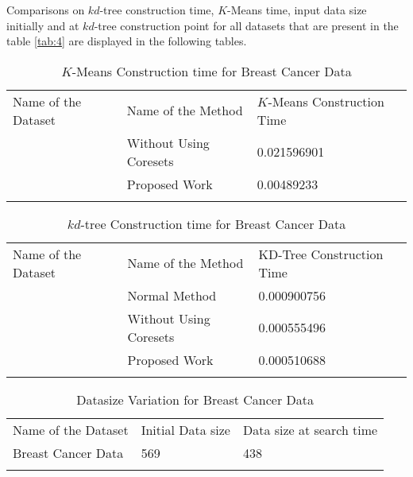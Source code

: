 \documentclass[runningheads]{llncs}
\begin{document}
Comparisons on $kd$-tree construction time, $K$-Means time, input data size initially and at $kd$-tree construction point for all datasets that are present in the table \ref{tab:4} are displayed in the following tables. 
\begin{table}[!hbt]
	\caption{$K$-Means Construction time for Breast Cancer Data}
	\label{tab:6}       %
	\begin{tabular}{p{3cm}p{4cm}p{3.4cm}}
		\hline\noalign{\smallskip}
		Name of the Dataset & Name of the Method & $K$-Means Construction Time  \\
		\noalign{\smallskip}\hline\noalign{\smallskip}
		\multirow{2}{*}{Breast Cancer Data} & Without Using Coresets & 0.021596901\\
		& Proposed Work  & 0.00489233\\
		\noalign{\smallskip}\hline\noalign{\smallskip}
	\end{tabular}
\end{table}

\begin{table}[!hbt]
	\caption{$kd$-tree Construction time for Breast Cancer Data}
	\label{tab:5}       %
	\begin{tabular}{p{3cm}p{4cm}p{3.4cm}}
		\hline\noalign{\smallskip}
		Name of the Dataset & Name of the Method & KD-Tree Construction Time  \\
		\noalign{\smallskip}\hline\noalign{\smallskip}
		\multirow{3}{*}{Breast Cancer Data} & Normal Method  & 0.000900756\\
		& Without Using Coresets & 0.000555496\\
		& Proposed Work  & 0.000510688\\
		\noalign{\smallskip}\hline\noalign{\smallskip}
	\end{tabular}
\end{table}


\begin{table}[!hbt]
	\caption{Datasize Variation for Breast Cancer Data}
	\label{tab:7}       %
	\begin{tabular}{p{3cm}p{4cm}p{3.4cm}}
		\hline\noalign{\smallskip}
		Name of the Dataset & Initial Data size & Data size at search time \\
		\noalign{\smallskip}\hline\noalign{\smallskip}
		Breast Cancer Data& 569  & 438 \\
		\noalign{\smallskip}\hline\noalign{\smallskip}
	\end{tabular}
\end{table}
\end{document}
